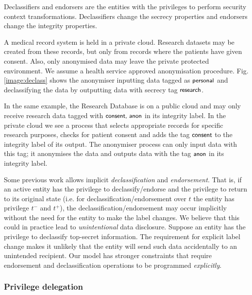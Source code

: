 \documentclass[10pt,journal,compsoc]{IEEEtran}
\begin{document}
Declassifiers and endorsers are the entities with the privileges to perform security context transformations. Declassifiers change the secrecy properties and endorsers change the integrity properties.


A medical record system is held in a private cloud. Research datasets may be created from these records, but only from records where the patients have given consent. Also, only anonymised data may leave the private protected environment. We assume a health service approved anonymisation procedure. Fig. \ref{image:declass} shows the anonymiser inputting data tagged as $\textsf{\small personal}$ and declassifying the data by outputting data with secrecy tag 
$\textsf{\small research}$. 

In the same example, the Research Database is on a public cloud and may only receive research data  tagged with $\textsf{\small consent, anon}$ in its integrity label. In the private cloud we see a process that selects appropriate records for specific research purposes, checks for patient consent and adds the tag $\textsf{\small consent}$ to the integrity label of its output. The anonymiser process can only input data with this tag; it anonymises the data and outputs data with the tag  $\textsf{\small anon}$ in its integrity label.



Some previous work \cite{Krohn:2007:IFC:1294261.1294293, porter2014practical} allows implicit \emph{declassification} and \emph{endorsement}. That is, if an active entity has the privilege to declassify/endorse and the privilege to return to its original state (i.e. for declassification\slash endorsement over $t$ the entity has privilege $t^-$ and $t^+$), the declassification/endorsement may occur implicitly without the need for the entity to make the label changes. 
We believe that this could in practice lead to 
\emph{unintentional} data disclosure. Suppose an entity has the privilege to declassify top-secret information. The requirement for explicit label change makes it unlikely that the entity will send such data accidentally to an unintended recipient. 
Our model has stronger constraints that require endorsement and declassification operations to be programmed \emph{explicitly}.

\subsubsection{Privilege delegation} 
\label{sec:model:delegation}
\end{document}
